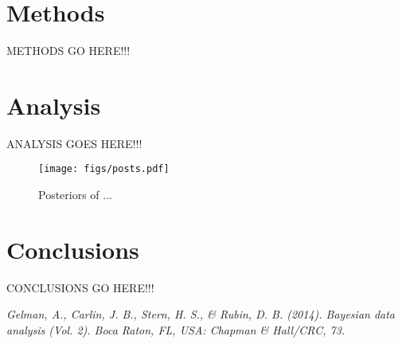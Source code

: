 \documentclass{../../tex_template/asaproc}
\begin{document}
\section{Methods}
METHODS GO HERE!!!

\section{Analysis}
ANALYSIS GOES HERE!!!
\begin{figure}[H]
  \texttt{[image: figs/posts.pdf]}
  \caption{\small Posteriors of ... }
  \label{fig:posts}
\end{figure}

\section{Conclusions}
CONCLUSIONS GO HERE!!!

\begin{references}
{\footnotesize
\itemsep=3pt
\item {\em Gelman, A., Carlin, J. B., Stern, H. S., \& Rubin, D. B. (2014). Bayesian data analysis (Vol. 2). Boca Raton, FL, USA: Chapman \& Hall/CRC, 73.}
}

\end{references}
\end{document}
